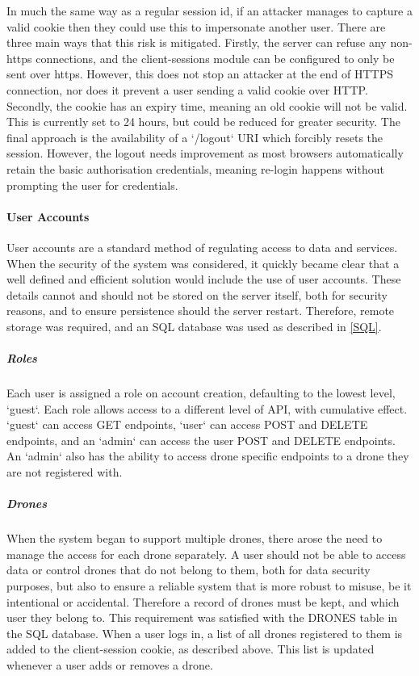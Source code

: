 \documentclass{article}
\begin{document}
In much the same way as a regular session id, if an attacker manages to capture a valid cookie then they could use this to impersonate another user. There are three main ways that this risk is mitigated. Firstly, the server can refuse any non-https connections, and the client-sessions module can be configured to only be sent over https. However, this does not stop an attacker at the end of HTTPS connection, nor does it prevent a user sending a valid cookie over HTTP. Secondly, the cookie has an expiry time, meaning an old cookie will not be valid. This is currently set to 24 hours, but could be reduced for greater security\cite{mozillaClientSessions}. The final approach is the availability of a `/logout` URI which forcibly resets the session. However, the logout needs improvement as most browsers automatically retain the basic authorisation credentials, meaning re-login happens without prompting the user for credentials. 


\paragraph{User Accounts}
User accounts are a standard method of regulating access to data and services. When the security of the system was considered, it quickly became clear that a well defined and efficient solution would include the use of user accounts. These details cannot and should not be stored on the server itself, both for security reasons, and to ensure persistence should the server restart. Therefore, remote storage was required, and an SQL database was used as described in \ref{SQL}.

\subparagraph{Roles}
Each user is assigned a role on account creation, defaulting to the lowest level, `guest`. Each role allows access to a different level of API, with cumulative effect. `guest` can access GET endpoints, `user` can access POST and DELETE endpoints, and an `admin` can access the user POST and DELETE endpoints. An `admin` also has the ability to access drone specific endpoints to a drone they are not registered with. 

\subparagraph{Drones}
When the system began to support multiple drones, there arose the need to manage the access for each drone separately. A user should not be able to access data or control drones that do not belong to them, both for data security purposes, but also to ensure a reliable system that is more robust to misuse, be it intentional or accidental. Therefore a record of drones must be kept, and which user they belong to. This requirement was satisfied with the DRONES table in the SQL database. When a user logs in, a list of all drones registered to them is added to the client-session cookie, as described above. This list is updated whenever a user adds or removes a drone. 
\end{document}
